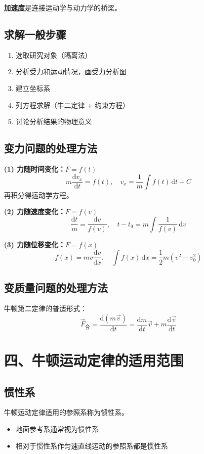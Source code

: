 \documentclass{ctexart}
\begin{document}
\textbf{加速度}是连接运动学与动力学的桥梁。

\subsection*{求解一般步骤}
\begin{enumerate}
  \item 选取研究对象（隔离法）
  \item 分析受力和运动情况，画受力分析图
  \item 建立坐标系
  \item 列方程求解（牛二定律 + 约束方程）
  \item 讨论分析结果的物理意义
\end{enumerate}

\subsection*{变力问题的处理方法}

\textbf{(1) 力随时间变化：$F = f(t)$}
\[
m\frac{\mathrm{d}v_x}{\mathrm{d}t} = f(t),\quad
v_x = \frac{1}{m}\int f(t)\,\mathrm{d}t + C
\]
再积分得运动学方程。

\textbf{(2) 力随速度变化：$F = f(v)$}
\[
\frac{\mathrm{d}t}{m} = \frac{\mathrm{d}v}{f(v)},\quad
t - t_0 = m\int\frac{1}{f(v)}\,\mathrm{d}v
\]

\textbf{(3) 力随位移变化：$F = f(x)$}
\[
f(x) = mv\frac{\mathrm{d}v}{\mathrm{d}x},\quad
\int f(x)\,\mathrm{d}x = \frac12 m(v^{2} - v_0^{2})
\]

\subsection*{变质量问题的处理方法}
牛顿第二定律的普适形式：
\[
\vec{F}_{\text{合}} = \frac{\mathrm{d}(m\vec{v})}{\mathrm{d}t}
= \frac{\mathrm{d}m}{\mathrm{d}t}\vec{v} + m\frac{\mathrm{d}\vec{v}}{\mathrm{d}t}
\]

\section*{四、牛顿运动定律的适用范围}

\subsection*{惯性系}
牛顿运动定律适用的参照系称为惯性系。
\begin{itemize}
  \item 地面参考系通常视为惯性系
  \item 相对于惯性系作匀速直线运动的参照系都是惯性系
\end{itemize}
\end{document}
